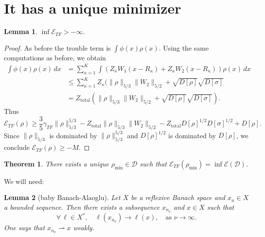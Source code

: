\documentclass[11pt]{amsart}
\newtheorem{thm}{Theorem}
\newtheorem{lem}{Lemma}
\theoremstyle{definition}
\theoremstyle{definition}
\theoremstyle{definition}
\numberwithin{equation}{section}
\begin{document}
\section{It has a unique minimizer} 
\begin{lem}
$\inf\mathcal{E}_{TF}>-\infty$.
\end{lem}
\begin{proof}
As before the trouble term is $\int \phi(x)\rho(x)$. Using the same computations as before, we obtain
\begin{align*}
\int \phi(x)\rho(x)\,dx&=\sum_{\kappa=1}^{K}\int(Z_\kappa W_1(x-R_\kappa)+Z_\kappa W_2(x-R_\kappa))\rho(x)\,dx\\
&\le\sum_{\kappa=1}^K Z_\kappa(\|\rho\|_{5/3}\|W_2\|_{5/2}+\sqrt{D[\rho]}\sqrt{D[\sigma]}\\
&=Z_\text{total}(\|\rho\|_{5/3}\|W_2\|_{5/2}+\sqrt{D[\rho]}\sqrt{D[\sigma]}).
\end{align*}
Thus
\begin{equation}\label{eqn:ETF-lower-bound}
\mathcal{E}_{TF}(\rho)\ge\frac{3}{5}\gamma_{TF}\|\rho\|_{5/3}^{5/3}-Z_\text{total}\|\rho\|_{5/3}\|W_2\|_{5/2}-Z_\text{total}D[\rho]^{1/2}D[\sigma]^{1/2}+D[\rho].
\end{equation}
Since $\|\rho\|_{5/3}$ is dominated by $\|\rho\|_{5/3}^{5/3}$ and $D[\rho]^{1/2}$ is dominated by $D[\rho]$, we conclude $\mathcal{E}_{TF}(\rho)\ge-M$.
\end{proof}

\begin{thm}
There exists a unique $\rho_\mathrm{min}\in\mathcal{D}$ such that $\mathcal{E}_{TF}(\rho_\mathrm{min})=\inf\mathcal{E}(\mathcal{D})$.
\end{thm}

We will need:
\begin{lem}[baby Banach-Alaoglu]
Let $X$ be a reflexive Banach space and $x_n\in X$ a bounded sequence. Then there exists a subsequence $x_{n_\nu}$ and $x\in X$ such that
\[
\forall\,\ell\in X^*,\quad \ell(x_{n_\nu})\to \ell(x),\quad\text{as }\nu\to\infty.
\]
One says that $x_{n_\nu}\rightharpoonup x$ \emph{weakly}.
\end{lem}
\end{document}
